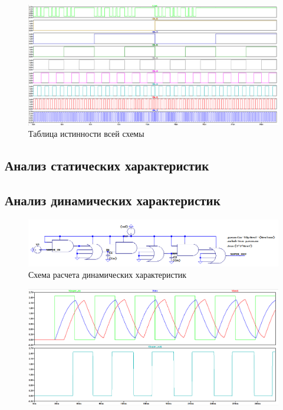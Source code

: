 \documentclass[a4paper,14pt]{article}
\begin{document}
\begin{figure}[H]
	\centering		
	\includegraphics[width=\linewidth]{image/spice_bin}
	\caption{Таблица истинности всей схемы}\label{img:spice_bin}
\end{figure}

\subsection{Анализ статических характеристик}

\subsection{Анализ динамических характеристик}

\begin{figure}[H]
	\centering
	\includegraphics[width=0.7\linewidth]{image/dyn_shema_min}
	\caption{Схема расчета динамических характеристик}
	\label{fig:dynshema}
\end{figure}

\begin{figure}[H]
	\centering
	\includegraphics[width=\linewidth]{image/dyn_max_freq}
	\caption{}
	\label{fig:dyn_max_freq}
\end{figure}
\end{document}
